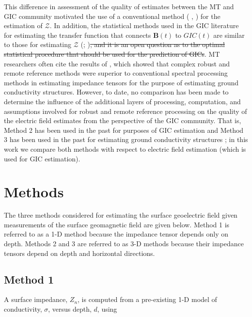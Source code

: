 \documentclass[12pt]{article}
\newcommand{\citeay}[1]{%
\citeauthor{#1}, \citeyear{#1}%
}
\providecommand{\DIFadd}[1]{{\protect\color{blue}\uwave{#1}}} %
\providecommand{\DIFdel}[1]{{\protect\color{red}\sout{#1}}}                      %
\providecommand{\DIFaddbegin}{} %
\providecommand{\DIFaddend}{} %
\providecommand{\DIFdelbegin}{} %
\providecommand{\DIFdelend}{} %
\begin{document}
This difference in assessment of the quality of estimates between the MT and GIC community motivated the use of a conventional method (\citeay{Sims1971}) for the estimation of $\mathcal{Z}$.  In addition, the statistical methods used in the GIC literature for estimating the transfer function that connects $\mathbf{B}(t)$ to $GIC(t)$ are similar to those for estimating $\mathcal{Z}$ (\cite{McKay2003}; \cite{Pulkkinen2007})\DIFdelbegin \DIFdel{, and it is an open question as to the optimal statistical procedure that should be used for the prediction of GICs}\DIFdelend . MT researchers often cite the results of \cite{Jones1989}, which showed that complex robust and remote reference methods were superior to conventional spectral processing methods in estimating impedance tensors for the purpose of estimating ground conductivity structures.  However, to date, no comparison has been made to determine the influence of the additional layers of processing, computation, and assumptions involved for robust and remote reference processing on the quality of the electric field estimates from the perspective of the GIC community.  That is, Method 2 has been used in the past for purposes of GIC estimation \DIFaddbegin \DIFadd{(\mbox{%
\cite{McKay2003}
}%
; \mbox{%
\cite{Pulkkinen2007}
}%
) }\DIFaddend and Method 3 has been used in the past for estimating ground conductivity structures \DIFaddbegin \DIFadd{(\mbox{%
\cite{Chave2012}
}%
and references therein)}\DIFaddend ; in this work we compare both methods with respect to electric field estimation (which is used for GIC estimation).

\section{Methods}

The three methods considered for estimating the surface geoelectric field given measurements of the surface geomagnetic field are given below.  Method 1 is referred to as a 1-D method because the impedance tensor depends only on depth.  Methods 2 and 3 are referred to as 3-D methods because their impedance tensors depend on depth and horizontal directions.

\subsection{Method 1}

A surface impedance, $Z_n$, is computed from a pre-existing 1-D model of conductivity, $\sigma$, versus depth, $d$, using
\end{document}
